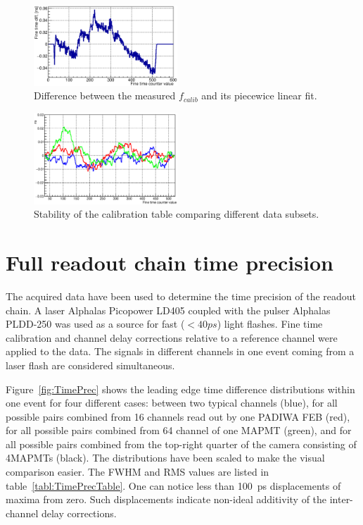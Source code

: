 \documentclass[final,5p,times,twocolumn]{elsarticle}
\begin{document}
\begin{figure}[tbh]
	\centering
	\includegraphics[width=0.48\textwidth]{figures/CalTableMinusFit_0010_01_feb2017.eps}
	\caption{Difference between the measured $ f_{calib} $ and its piecewice linear fit.}
	\label{fig:CalibTableMinusLinear}
\end{figure}

\begin{figure}[tbh]
	\centering
	\includegraphics[width=0.48\textwidth]{figures/Stability_01_diff.eps}
	\caption{Stability of the calibration table comparing different data subsets.}
	\label{fig:CalibStability}
\end{figure}

\section{Full readout chain time precision}

The acquired data have been used to determine the time precision of the readout chain. A laser Alphalas Picopower LD405 coupled with the pulser Alphalas PLDD-250 \cite{LASER} was used as a source for fast ($<40ps$) light flashes. Fine time calibration and channel delay corrections relative to a reference channel were applied to the data. The signals in different channels in one event coming from a laser flash are considered simultaneous.

Figure~\ref{fig:TimePrec} shows the leading edge time difference distributions within one event for four different cases:
between two typical channels (blue), for all possible pairs combined from 16 channels read out by one PADIWA FEB (red), for all possible pairs combined from 64 channel of one MAPMT (green), and  for all possible pairs combined from the top-right quarter of the camera consisting of 4MAPMTs (black).
The distributions have been scaled to make the visual comparison easier. The FWHM and RMS values are listed in table~\ref{tabl:TimePrecTable}.
One can notice less than 100~ps displacements of maxima from zero. Such displacements indicate non-ideal additivity of the inter-channel delay corrections.
\end{document}

